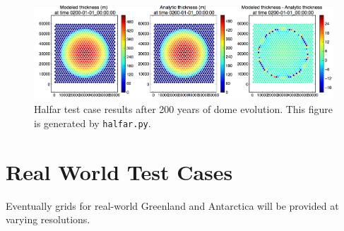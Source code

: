 \begin{figure}[H!]
	\centering
	\includegraphics[width=16.4cm]{landice/figures/halfar.png}
	\caption{Halfar test case results after 200 years of dome evolution. This figure is generated by \texttt{halfar.py}.}
	\label{fig:halfarresults}
\end{figure}


\FloatBarrier


\section{Real World Test Cases}
Eventually grids for real-world Greenland and Antarctica will be provided at varying resolutions.


